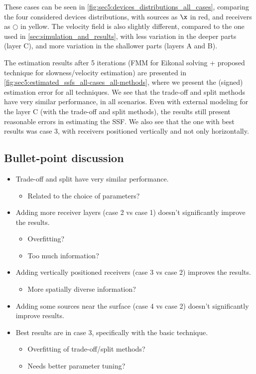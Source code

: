 These cases can be seen in \cref{fig:sec5:devices_distributions_all_cases}, comparing the four considered devices distributions, with sources as $\x$ in red, and receivers as $\bigcirc$ in yellow. The velocity field is also slightly different, compared to the one used in \cref{sec:simulation_and_results}, with less variation in the deeper parts (layer C), and more variation in the shallower parts (layers A and B).

The estimation results after 5 iterations (FMM for Eikonal solving + proposed technique for slowness/velocity estimation) are presented in \cref{fig:sec5:estimated_ssfs_all-cases_all-methods}, where we present the (signed) estimation error for all techniques. We see that the trade-off and split methods have very similar performance, in all scenarios. Even with external modeling for the layer C (with the trade-off and split methods), the results still present reasonable errors in estimating the SSF. We also see that the one with best results was case 3, with receivers positioned vertically and not only horizontally. 





\cleardoublepage
\subsection{Bullet-point discussion}

\begin{itemize}
	\item Trade-off and split have very similar performance.
	\begin{itemize}
		\item Related to the choice of parameters?
	\end{itemize}
	\item Adding more receiver layers (case 2 vs case 1) doesn't significantly improve the results.
	\begin{itemize}
		\item Overfitting?
		\item Too much information?
	\end{itemize}
	\item Adding vertically positioned receivers (case 3 vs case 2) improves the results.
	\begin{itemize}
		\item More spatially diverse information?
	\end{itemize}
	\item Adding some sources near the surface (case 4 vs case 2) doesn't significantly improve results.
	\item Best results are in case 3, specifically with the basic technique.
	\begin{itemize}
		\item Overfitting of trade-off/split methods?
		\item Needs better parameter tuning?
	\end{itemize}
\end{itemize}

